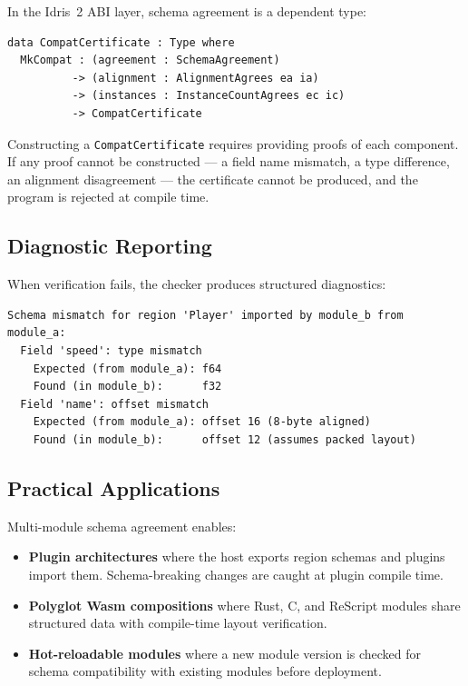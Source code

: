 \documentclass[sigplan,nonacm,screen]{acmart}
\begin{document}
In the Idris~2 ABI layer, schema agreement is a dependent type:

\begin{lstlisting}[language=Idris2,caption={Schema agreement certificate in Idris~2.}]
data CompatCertificate : Type where
  MkCompat : (agreement : SchemaAgreement)
          -> (alignment : AlignmentAgrees ea ia)
          -> (instances : InstanceCountAgrees ec ic)
          -> CompatCertificate
\end{lstlisting}

Constructing a \texttt{CompatCertificate} requires providing proofs of
each component. If any proof cannot be constructed --- a field name
mismatch, a type difference, an alignment disagreement --- the certificate
cannot be produced, and the program is rejected at compile time.

\subsection{Diagnostic Reporting}

When verification fails, the checker produces structured diagnostics:

\begin{lstlisting}[caption={Example diagnostic output for a schema mismatch.}]
Schema mismatch for region 'Player' imported by module_b from module_a:
  Field 'speed': type mismatch
    Expected (from module_a): f64
    Found (in module_b):      f32
  Field 'name': offset mismatch
    Expected (from module_a): offset 16 (8-byte aligned)
    Found (in module_b):      offset 12 (assumes packed layout)
\end{lstlisting}

\subsection{Practical Applications}

Multi-module schema agreement enables:

\begin{itemize}
  \item \textbf{Plugin architectures} where the host exports region schemas
    and plugins import them. Schema-breaking changes are caught at plugin
    compile time.

  \item \textbf{Polyglot Wasm compositions} where Rust, C, and ReScript
    modules share structured data with compile-time layout verification.

  \item \textbf{Hot-reloadable modules} where a new module version is
    checked for schema compatibility with existing modules before deployment.
\end{itemize}
\end{document}
